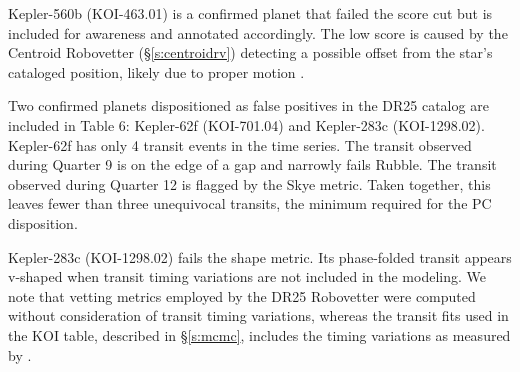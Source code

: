 Kepler-560b (KOI-463.01) is a confirmed planet that failed the score cut but is included for awareness and annotated accordingly.  The low score is caused by the Centroid Robovetter (\S\ref{s:centroidrv}) detecting a possible offset from the star's cataloged position, likely due to proper motion \citep{Mann2017}.  

Two confirmed planets dispositioned as false positives in the DR25 catalog are included in Table 6: Kepler-62f (KOI-701.04) and Kepler-283c (KOI-1298.02).  Kepler-62f has only 4 transit events in the time series.  The transit observed during Quarter 9 is on the edge of a gap and narrowly fails Rubble.  The transit observed during Quarter 12 is flagged by the Skye metric.  Taken together, this leaves fewer than three unequivocal transits, the minimum required for the PC disposition. 

Kepler-283c (KOI-1298.02) fails the shape metric.  Its phase-folded transit appears v-shaped when transit timing variations are not included in the modeling.  We note that vetting metrics employed by the DR25 Robovetter were computed without consideration of transit timing variations, whereas the transit fits used in the KOI table, described in \S\ref{s:mcmc}, includes the timing variations as measured by \citet{Rowe2015cat}. 



